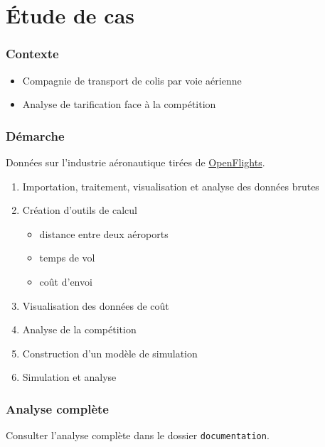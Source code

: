 \section{Étude de cas}

\begin{frame}
  \frametitle{Contexte}

  \begin{itemize}
  \item Compagnie de transport de colis par voie aérienne
  \item Analyse de tarification face à la compétition
  \end{itemize}
\end{frame}

\begin{frame}
  \frametitle{Démarche}

  Données sur l'industrie aéronautique tirées de
  \href{https://openflights.org/data.html}{OpenFlights}.

  \begin{enumerate}
  \item Importation, traitement, visualisation et analyse des données
    brutes
  \item Création d'outils de calcul
    \begin{itemize}
    \item distance entre deux aéroports
    \item temps de vol
    \item coût d'envoi
    \end{itemize}
  \item Visualisation des données de coût
  \item Analyse de la compétition
  \item Construction d'un modèle de simulation
  \item Simulation et analyse
  \end{enumerate}
\end{frame}

\begin{frame}
  \frametitle{Analyse complète}

  Consulter l'analyse complète dans le dossier \texttt{documentation}.
\end{frame}

